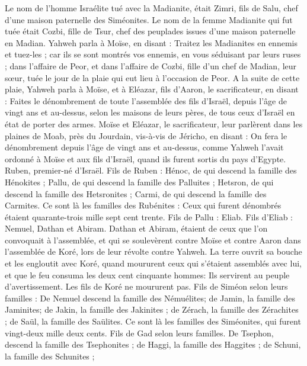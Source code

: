 \begin{multicols}{2}
Le nom de l'homme Israélite tué avec la Madianite, était Zimri, fils de Salu, chef d'une maison paternelle des Siméonites.
Le nom de la femme Madianite qui fut tuée était Cozbi, fille de Tsur, chef des peuplades issues d'une maison paternelle en Madian.
Yahweh parla à Moïse, en disant :
Traitez les Madianites en ennemis et tuez-les ;
car ils se sont montrés vos ennemis, en vous séduisant par leurs ruses ; dans l'affaire de Peor, et dans l'affaire de Cozbi, fille d'un chef de Madian, leur sœur, tuée le jour de la plaie qui eut lieu à l'occasion de Peor.
\VerseOne{}A la suite de cette plaie, Yahweh parla à Moïse, et à Eléazar, fils d'Aaron, le sacrificateur, en disant :
Faites le dénombrement de toute l'assemblée des fils d'Israël, depuis l'âge de vingt ans et au-dessus, selon les maisons de leurs pères, de tous ceux d'Israël en état de porter des armes.
Moïse et Eléazar, le sacrificateur, leur parlèrent dans les plaines de Moab, près du Jourdain, vis-à-vis de Jéricho, en disant :
On fera le dénombrement depuis l'âge de vingt ans et au-dessus, comme Yahweh l'avait ordonné à Moïse et aux fils d'Israël, quand ils furent sortis du pays d'Egypte.
Ruben, premier-né d'Israël. Fils de Ruben : Hénoc, de qui descend la famille des Hénokites ; Pallu, de qui descend la famille des Palluites ;
Hetsron, de qui descend la famille des Hetsronites ; Carmi, de qui descend la famille des Carmites.
Ce sont là les familles des Rubénites : Ceux qui furent dénombrés étaient quarante-trois mille sept cent trente.
Fils de Pallu : Eliab.
Fils d'Eliab : Nemuel, Dathan et Abiram. Dathan et Abiram, étaient de ceux que l'on convoquait à l'assemblée, et qui se soulevèrent contre Moïse et contre Aaron dans l'assemblée de Koré, lors de leur révolte contre Yahweh.
La terre ouvrit sa bouche et les engloutit avec Koré, quand moururent ceux qui s'étaient assemblés avec lui, et que le feu consuma les deux cent cinquante hommes: Ils servirent au peuple d'avertissement.
Les fils de Koré ne moururent pas.
Fils de Siméon selon leurs familles : De Nemuel descend la famille des Némuélites; de Jamin, la famille des Jaminites; de Jakin, la famille des Jakinites ;
de Zérach, la famille des Zérachites ; de Saül, la famille des Saülites.
Ce sont là les familles des Siméonites, qui furent vingt-deux mille deux cents.
Fils de Gad selon leurs familles. De Tsephon, descend la famille des Tsephonites ; de Haggi, la famille des Haggites ; de Schuni, la famille des Schunites ;

\end{multicols}
